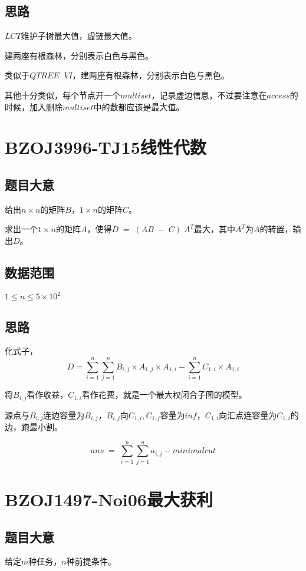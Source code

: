 \documentclass{ctexart}
\numberwithin{equation}{section}
\begin{document}
\begin{flushleft}
  \subsection{思路}
  $LCT$维护子树最大值，虚链最大值。

  建两座有根森林，分别表示白色与黑色。

  类似于$QTREE\;\; VI$，建两座有根森林，分别表示白色与黑色。

  其他十分类似，每个节点开一个$multiset$，记录虚边信息，不过要注意在$access$的时候，加入删除$multiset$中的数都应该是最大值。

  \newpage

  \section{BZOJ3996-TJ15线性代数}
  \subsection{题目大意}
  给出$n\times n$的矩阵$B$，$1\times n$的矩阵$C$。

  求出一个$1\times n$的矩阵$A$，使得$D\;=\;(AB\;-\;C)\;A^T$最大，其中$A^T$为$A$的转置，输出$D$。
  
  \subsection{数据范围}
  $1\le n \le 5\times 10^2$
  \subsection{思路}
  化式子，$$D=\sum_{i=1}^n\sum_{j=1}^nB_{i,j}\times A_{1,j}\times A_{1,i}-\sum_{i=1}^nC_{1,i}\times A_{1,i}$$

  将$B_{i,j}$看作收益，$C_{1,i}$看作花费，就是一个最大权闭合子图的模型。

  源点与$B_{i,j}$连边容量为$B_{i,j}$，$B_{i,j}$向$C_{1,i},C_{1,j}$容量为$inf$，$C_{1,i}$向汇点连容量为$C_{1,i}$的边，跑最小割。

  $$ans\;=\; \sum_{i=1}^n\sum_{j=1}^na_{i,j}-minimalcut$$

  \newpage

  \section{BZOJ1497-Noi06最大获利}
  \subsection{题目大意}
  给定$m$种任务，$n$种前提条件。


\end{flushleft}
\end{document}
